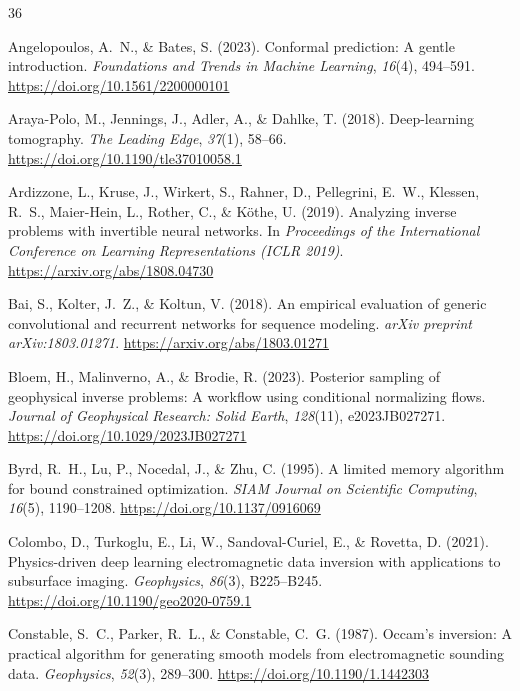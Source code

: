 \documentclass[journal]{IEEEtran}
\begin{document}
\begin{thebibliography}{36}

Angelopoulos, A.~N., \& Bates, S. (2023).
Conformal prediction: A gentle introduction.
\textit{Foundations and Trends in Machine Learning},
\textit{16}(4), 494--591.
\url{https://doi.org/10.1561/2200000101}

Araya-Polo, M., Jennings, J., Adler, A., \& Dahlke, T. (2018).
Deep-learning tomography.
\textit{The Leading Edge}, \textit{37}(1), 58--66.
\url{https://doi.org/10.1190/tle37010058.1}

Ardizzone, L., Kruse, J., Wirkert, S., Rahner, D., Pellegrini, E.~W.,
Klessen, R.~S., Maier-Hein, L., Rother, C., \& K{\"o}the, U. (2019).
Analyzing inverse problems with invertible neural networks.
In \textit{Proceedings of the International Conference on Learning
Representations (ICLR 2019)}.
\url{https://arxiv.org/abs/1808.04730}

Bai, S., Kolter, J.~Z., \& Koltun, V. (2018).
An empirical evaluation of generic convolutional and recurrent
networks for sequence modeling.
\textit{arXiv preprint arXiv:1803.01271}.
\url{https://arxiv.org/abs/1803.01271}

Bloem, H., Malinverno, A., \& Brodie, R. (2023).
Posterior sampling of geophysical inverse problems: A workflow using
conditional normalizing flows.
\textit{Journal of Geophysical Research: Solid Earth}, \textit{128}(11),
e2023JB027271.
\url{https://doi.org/10.1029/2023JB027271}

Byrd, R.~H., Lu, P., Nocedal, J., \& Zhu, C. (1995).
A limited memory algorithm for bound constrained optimization.
\textit{SIAM Journal on Scientific Computing}, \textit{16}(5),
1190--1208.
\url{https://doi.org/10.1137/0916069}

Colombo, D., Turkoglu, E., Li, W., Sandoval-Curiel, E., \&
Rovetta, D. (2021).
Physics-driven deep learning electromagnetic data inversion with
applications to subsurface imaging.
\textit{Geophysics}, \textit{86}(3), B225--B245.
\url{https://doi.org/10.1190/geo2020-0759.1}

Constable, S.~C., Parker, R.~L., \& Constable, C.~G. (1987).
Occam's inversion: A practical algorithm for generating smooth
models from electromagnetic sounding data.
\textit{Geophysics}, \textit{52}(3), 289--300.
\url{https://doi.org/10.1190/1.1442303}


\end{thebibliography}
\end{document}
